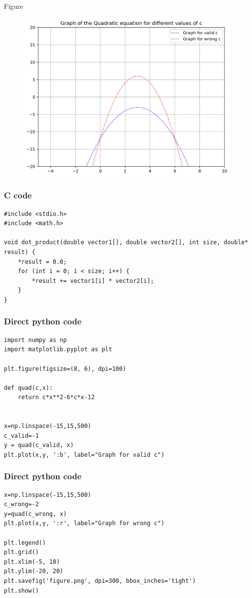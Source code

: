 \documentclass{beamer}
\begin{document}
\begin{frame}{Figure}
    \begin{figure}[H]
    \centering
    \includegraphics[width=0.6\columnwidth]{figs/figure.png}
    \label{fig:placeholder}
\end{figure}
\end{frame}

\begin{frame}[fragile]
\frametitle{C code}
\begin{lstlisting}
#include <stdio.h>
#include <math.h>

void dot_product(double vector1[], double vector2[], int size, double* result) {
    *result = 0.0;
    for (int i = 0; i < size; i++) {
        *result += vector1[i] * vector2[i];
    }
}
\end{lstlisting}
\end{frame}
\begin{frame}[fragile]
\frametitle{Direct python code}
\begin{lstlisting}
import numpy as np
import matplotlib.pyplot as plt

plt.figure(figsize=(8, 6), dpi=100)  

def quad(c,x):
    return c*x**2-6*c*x-12


x=np.linspace(-15,15,500)
c_valid=-1
y = quad(c_valid, x)
plt.plot(x,y, ':b', label="Graph for valid c")
\end{lstlisting}
\end{frame}
\begin{frame}[fragile]
\frametitle{Direct python code}
\begin{lstlisting}
x=np.linspace(-15,15,500)
c_wrong=-2
y=quad(c_wrong, x)
plt.plot(x,y, ':r', label="Graph for wrong c")

plt.legend()
plt.grid()
plt.xlim(-5, 10)
plt.ylim(-20, 20)
plt.savefig('figure.png', dpi=300, bbox_inches='tight')
plt.show()
\end{lstlisting}
\end{frame}
\end{document}
